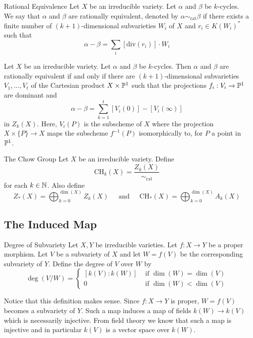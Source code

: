 \documentclass[a4paper]{article}
\begin{document}
\begin{defn}{Rational Equivalence}{} Let $X$ be an irreducible variety. Let $\alpha$ and $\beta$ be $k$-cycles. We say that $\alpha$ and $\beta$ are rationally equivalent, denoted by $\alpha\sim_{\text{rat}}\beta$ if there exists a finite number of $(k+1)$-dimensional subvarieties $W_i$ of $X$ and $r_i\in K(W_i)^\ast$ such that $$\alpha-\beta=\sum_i[\text{div}(r_i)]\cdot W_i$$
\end{defn}

\begin{thm}{}{} Let $X$ be an irreducible variety. Let $\alpha$ and $\beta$ be $k$-cycles. Then $\alpha$ and $\beta$ are rationally equivalent if and only if there are $(k+1)$-dimensional subvarieties $V_1,\dots,V_t$ of the Cartesian product $X\times\mathbb{P}^1$ such that the projections $f_i:V_i\to\mathbb{P}^1$ are dominant and $$\alpha-\beta=\sum_{k=1}^t[V_i(0)]-[V_i(\infty)]$$ in $Z_k(X)$. Here, $V_i(P)$ is the subscheme of $X$ where the projection $X\times\{P\}\to X$ maps the subscheme $f^{-1}(P)$ isomorphically to, for $P$ a point in $\mathbb{P}^1$. 
\end{thm}

\begin{defn}{The Chow Group}{} Let $X$ be an irreducible variety. Define $$\text{CH}_k(X)=\frac{Z_k(X)}{\sim_\text{rat}}$$ for each $k\in\mathbb{N}$. Also define $$Z_\ast(X)=\bigoplus_{k=0}^{\dim(X)}Z_k(X)\;\;\;\;\text{ and }\;\;\;\;\text{CH}_\ast(X)=\bigoplus_{k=0}^{\dim(X)}A_k(X)$$
\end{defn}

\subsection{The Induced Map}
\begin{defn}{Degree of Subvariety}{} Let $X,Y$ be irreducible varieties. Let $f:X\to Y$ be a proper morphism. Let $V$ be a subvariety of $X$ and let $W=f(V)$ be the corresponding subvariety of $Y$. Define the degree of $V$ over $W$ by $$\deg(V/W)=\begin{cases}
[k(V):k(W)] & \text{ if } \dim(W)=\dim(V)\\
0 & \text{ if } \dim(W)<\dim(V)
\end{cases}$$
\end{defn}

Notice that this definition makes sense. Since $f:X\to Y$ is proper, $W=f(V)$ becomes a subvariety of $Y$. Such a map induces a map of fields $k(W)\to k(V)$ which is necessarily injective. From field theory we know that such a map is injective and in particular $k(V)$ is a vector space over $k(W)$. 
\end{document}
